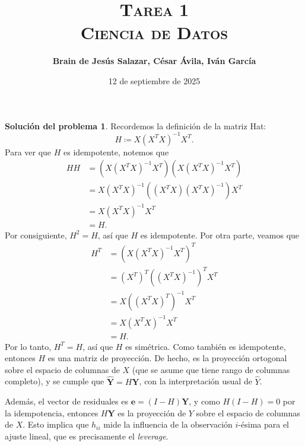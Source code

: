 \documentclass[twoside,12pt]{article}
\title{\textsc{Tarea 1\\ {\Large Ciencia de Datos}}}
\author{\large{\textbf{Brain de Jesús Salazar, César Ávila, Iván García}}}
\date{12 de septiembre de 2025}
\theoremstyle{definition}
\newtheorem{soln}{Solución del problema}
\begin{document}
\maketitle


\begin{soln}
Recordemos la definición de la matriz Hat:
\[
H\coloneqq X{({X^T} X)}^{-1}X^T.
\]
Para ver que $H$ es idempotente, notemos que
\[
\begin{split}
  HH &= \left(X{(X^T X)}^{-1}X^T\right)\left(X{(X^T X)}^{-1}X^T\right)\\
  &= X{(X^T X)}^{-1} \left((X^T X) {(X^T X)}^{-1}\right) X^T\\
  &= X{(X^T X)}^{-1} X^T\\
  &= H.
\end{split}
\]
Por consiguiente, $H^2=H$, así que $H$ es idempotente. Por otra parte, veamos que
\[
\begin{split}
  H^T &={\left(X{(X^T X)}^{-1} X^T \right)}^T\\
  & ={{(X^T)}^T \left({(X^T X)}^{-1}\right)}^T {X}^T\\
  & =X {\left({\left(X^T X\right)}^T\right)}^{-1} X^T\\
  & =X {(X^T X)}^{-1} X^T\\
  & =H.
\end{split}
\]
Por lo tanto, $H^T=H$, así que $H$ es simétrica. Como también es idempotente, entonces $H$ es una matriz de proyección. De hecho, es la proyección ortogonal sobre el espacio de columnas de $X$ (que se asume que tiene rango de columnas completo), y se cumple que $\hat{\boldsymbol{Y}}=H\boldsymbol{Y}$, con la interpretación usual de $\hat{Y}$.

Además, el vector de residuales es $\boldsymbol{e}=(I-H)\boldsymbol{Y}$, y como $H(I-H)=0$ por la idempotencia, entonces $H\boldsymbol{Y}$ es la proyección de $Y$ sobre el espacio de columnas de $X$. Esto implica que $h_{ii}$ mide la influencia de la observación $i$-ésima para el ajuste lineal, que es precisamente el \textit{leverage}.
\end{soln}
\end{document}
